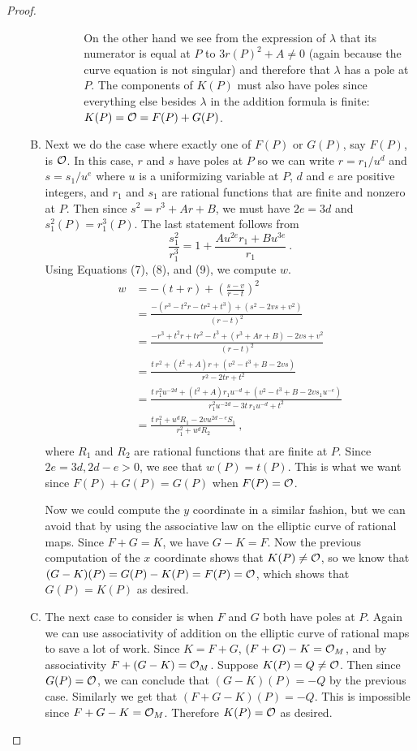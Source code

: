 \begin{proof}
\begin{enumerate}[(I)]
\begin{enumerate}[(A)]
\begin{enumerate}[(1)]
\begin{enumerate}
On the other hand we see from the expression of $\lambda$ that its numerator is equal at $P$ to $3r(P)^{2}+A \neq 0$ (again because the curve equation is not singular) and therefore that $\lambda$ has a pole at $P$. The components of $K(P)$ must also have poles since everything else besides $\lambda$ in the addition formula is finite: $K(P)=\mathcal{O} = F(P)+G(P)$.
\end{enumerate}
\end{enumerate}
\item
Next we do the case where exactly one of $F(P)$ or $G(P)$, say $F(P)$, is $\mathcal{O}$. In this case, $r$ and $s$ have poles at $P$ so we can write $r=r_{1}/u^{d}$ and $s=s_{1}/u^{e}$ where $u$ is a uniformizing variable at $P$, $d$ and $e$ are positive integers, and $r_{1}$ and $s_{1}$ are rational functions that are finite and nonzero at $P$. Then since $s^{2}=r^{3}+Ar+B$, we must have $2e=3d$ and $s_{1}^{2}(P)=r_{1}^{3}(P)$. The last statement follows from
$$
\frac{s_{1}^{2}}{r_{1}^{3}}=1+\frac{Au^{2e}r_{1}+Bu^{3e}}{r_{1}}\ .
$$
Using Equations (7), (8), and (9), we compute $w$.
\begin{align*}
w&=-(t+r)+\left(\frac{s-v}{r-t}\right)^{2}\\
&=\frac{-(r^{3}-t^{2}r-tr^{2}+t^{3})+(s^{2}-2vs+v^{2})}{(r-t)^{2}}\\
&=\frac{-r^{3}+t^{2}r+tr^{2}-t^{3}+(r^{3}+Ar+B)-2vs+v^{2}}{(r-t)^{2}}\\
&=\frac{t\, r^{2}+(t^{2}+A)r+(v^{2}-t^{3}+B-2vs)}{r^{2}-2tr+t^{2}}\\
&=\frac{t\, r_{1}^{2}u^{-2d}+(t^{2}+A)r_{1}u^{-d}+(v^{2}-t^{3}+B-2vs_{1}u^{-e})}{r_{1}^{2}u^{-2d}-3t\, r_{1}u^{-d}+t^{2}}\\
&=\frac{t\, r_{1}^{2}+u^{d}R_{1}-2vu^{2d-e} {S_{1}}}{r_{1}^{2}+u^{d}R_{2}}\ ,\\
\end{align*}
where $R_{1}$ and $R_{2}$ are rational functions that are finite at $P$. Since $2e=3d,2d-e>0$, we see that $w(P)=t(P)$. This is what we want since $F(P)+G(P)=G(P)$ when $F(P)=\mathcal{O}$.

Now we could compute the $y$ coordinate in a similar fashion, but we can avoid that by using the associative law on the elliptic curve of rational maps. Since $F+G=K$, we have $G-K=F$. Now the previous computation of the $x$ coordinate shows that $K(P)\neq \mathcal{O}$, so we know that $(G-K)(P)=G(P)-K(P) = F(P)=\mathcal{O}$, which shows that $G(P)=K(P)$ as desired.
\item
The next case to consider is when $F$ and $G$ both have poles at $P$. Again we can use associativity of addition on the elliptic curve of rational maps to save a lot of work. Since $K=F+G$, $(F+G)-K=\mathcal{O}_{M}$, and by associativity $F+(G-K)=\mathcal{O}_{M}$. Suppose $K(P)=Q \neq \mathcal{O}$. Then since $G(P)=\mathcal{O}$, we can conclude that $(G-K)(P)=-Q$ by the previous case. Similarly we get that $(F+G-K)(P)=-Q$. This is impossible since $F+G-K=\mathcal{O}_M$. Therefore $K(P)=\mathcal{O}$ as desired.


\end{enumerate}
\end{enumerate}
\end{proof}
